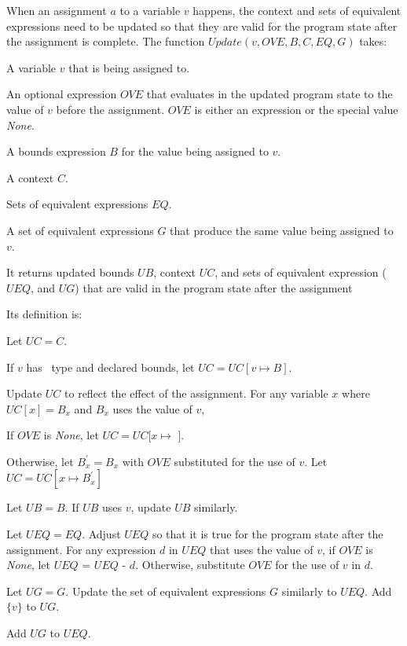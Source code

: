 When an assignment $a$ to a variable $v$ happens, the context and sets of equivalent expressions
need to be updated so that they are valid for the program state after the assignment is complete.
The function $Update(v, OVE, B, C, EQ, G)$ takes:
\begin{compactitem}
\item A variable $v$ that is being assigned to.
\item An optional expression $OVE$ that evaluates in the updated program state to the value of $v$ 
before the assignment.  $OVE$ is either an expression
or the special value {\it None}.
\item A bounds expression $B$ for the value being assigned to $v$.
\item A context $C$.
\item Sets of equivalent expressions $EQ$. 
\item A set of equivalent expressions $G$ that produce the same value being assigned to $v$.
\end{compactitem}
It returns updated bounds $UB$, context $UC$, and sets of equivalent expression ($UEQ$, and $UG$)
that are valid in the program state after the assignment

Its definition is:
\begin{compactenum}
\item Let $UC = C$.
\item If $v$ has \arrayptr\ type and declared bounds, let $UC = UC[v \mapsto B]$.
\item Update $UC$ to reflect the effect of the assignment.  For any variable $x$ where $UC[x] = B_x$ and
$B_x$ uses the value of $v$,
\begin{compactenum}
\item If $OVE$ is {\it None}, let $UC = UC[x \mapsto$ \boundsunknown $]$.
\item  Otherwise, let $B_x^\prime = B_x$ with $OVE$ substituted for the use of $v$.  
Let $UC = UC[x \mapsto B_x^\prime]$
\end{compactenum}
\item Let $UB = B$.  If $UB$ uses $v$, update $UB$ similarly.
\item Let $UEQ = EQ$.  Adjust $UEQ$ so that it is true for the program state after the assignment. For any expression $d$ in $UEQ$ that uses the value of $v$, if $OVE$ is {\it None}, let $UEQ$ = $UEQ $ - $d$.
Otherwise, substitute $OVE$ for the use of $v$ in $d$.
\item Let $UG = G$. Update the set of equivalent expressions $G$ similarly to $UEQ$. Add $\{v\}$ to $UG$.
\item Add $UG$ to $UEQ$.
\end{compactenum}

